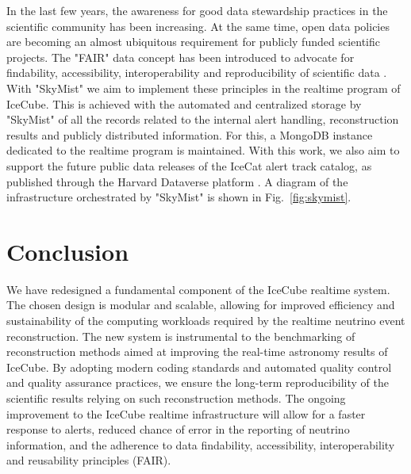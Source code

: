 \documentclass[a4paper,11pt]{article}
\begin{document}
In the last few years, the awareness for good data stewardship practices in the scientific community has been increasing. At the same time, open data policies are becoming an almost ubiquitous requirement for publicly funded scientific projects. The "FAIR" data concept has been introduced to advocate for findability, accessibility, interoperability and reproducibility of scientific data \cite{Wilkinson2016}. With "SkyMist" we aim to implement these principles in the realtime program of IceCube. This is achieved with the automated and centralized storage by "SkyMist" of all the records related to the internal alert handling, reconstruction results and publicly distributed information. For this, a MongoDB instance dedicated to the realtime program is maintained. With this work, we also aim to support the future public data releases of the IceCat alert track catalog, as published through the Harvard Dataverse platform \cite{DVN/SCRUCD_2023}. A diagram of the infrastructure orchestrated by "SkyMist" is shown in Fig.~\ref{fig:skymist}.

\section{Conclusion}

We have redesigned a fundamental component of the IceCube realtime system. The chosen design is modular and scalable, allowing for improved efficiency and sustainability of the computing workloads required by the realtime neutrino event reconstruction. The new system is instrumental to the benchmarking of reconstruction methods aimed at improving the real-time astronomy results of IceCube. By adopting modern coding standards and automated quality control and quality assurance practices, we ensure the long-term reproducibility of the scientific results relying on such reconstruction methods. The ongoing improvement to the IceCube realtime infrastructure will allow for a faster response to alerts, reduced chance of error in the reporting of neutrino information, and the adherence to data findability, accessibility, interoperability and reusability principles (FAIR).




%

\clearpage


\end{document}
